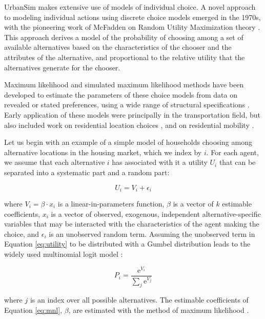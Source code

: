 UrbanSim makes extensive use of models of individual choice. A novel approach to modeling individual actions using discrete choice models emerged in the 1970s, with the pioneering work of McFadden on Random Utility Maximization theory \citep{mcfadden-1974,mcfadden-1981}. This approach derives a model of the probability of choosing among a set of available alternatives based on the characteristics of the chooser and the attributes of the alternative, and proportional to the relative utility that the alternatives generate for the chooser.

Maximum likelihood and simulated maximum likelihood methods have been developed to estimate the parameters of these choice models from data on revealed or stated preferences, using a wide range of structural specifications \citep{train-book-2003}. Early application of these models were principally in the transportation field, but also included work on residential location choices \citep{quigley-eer-1976,lerman-trr-1977,mcfadden-1978}, and on residential mobility \citep{clark-vanlierop-1986}.

Let us begin with an example of a simple model of households choosing among alternative locations in the housing market, which we index by $i$. For each agent, we assume that each alternative $i$ has associated with it a utility $U_i$ that can be separated into a systematic part and a random part:

\begin{equation}
    \label{eq:utility}
    U_i = V_i + \epsilon_i
\end{equation}

where $V_i = \beta\cdot {x}_i$ is a linear-in-parameters function, $\beta$ is a vector of $k$ estimable coefficients, $x_i$ is a vector of observed, exogenous, independent alternative-specific variables that may be interacted with the characteristics of the agent making the choice, and $\epsilon_i$ is an unobserved random term. Assuming the unobserved term in Equation \ref{eq:utility} to be distributed with a Gumbel distribution leads to the widely used multinomial logit model \citep{mcfadden-1974,mcfadden-1981}:

\begin{equation}
    \label{eq:mnl}
    P_i = \frac{\mathrm{e}^{V_i}}{\sum_j \mathrm{e}^{V_j}}
\end{equation}

where $j$ is an index over all possible alternatives. The estimable coefficients of Equation \ref{eq:mnl}, $\beta$, are estimated with the method of maximum likelihood \citep{greene-2002}.

